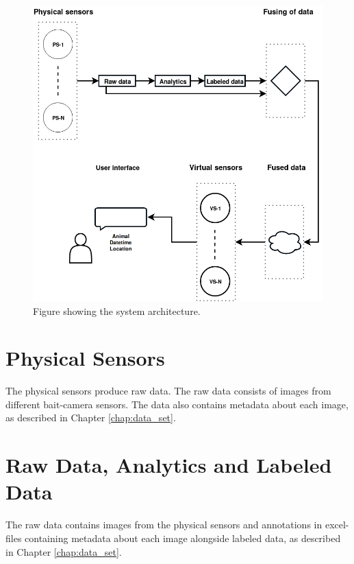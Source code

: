 \documentclass[USenglish]{uit-thesis}
\begin{document}


\begin{figure}
\centering
\includegraphics[width=\textwidth]{Architecture_otto_done.png}
\caption{Figure showing the system architecture.}
\label{fig:architecture1}
\end{figure}


\section{Physical Sensors}
The physical sensors produce raw data. The raw data consists of images from different bait-camera sensors.
The data also contains metadata about each image, as described in Chapter \ref{chap:data_set}. 


\section{Raw Data, Analytics and Labeled Data}
The raw data contains images from the physical sensors and annotations in excel-files containing metadata about each image alongside labeled data, as described in Chapter \ref{chap:data_set}.

\end{document}
